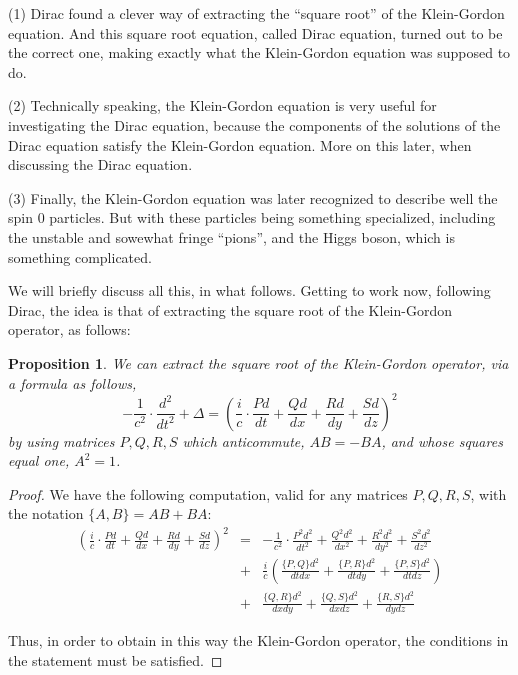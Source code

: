 \documentclass[12pt]{amsbook}
\newtheorem{proposition}[theorem]{Proposition}
\begin{document}
\bigskip

(1) Dirac found a clever way of extracting the ``square root'' of the Klein-Gordon equation. And this square root equation, called Dirac equation, turned out to be the correct one, making exactly what the Klein-Gordon equation was supposed to do.

\bigskip

(2) Technically speaking, the Klein-Gordon equation is very useful for investigating the Dirac equation, because the components of the solutions of the Dirac equation satisfy the Klein-Gordon equation. More on this later, when discussing the Dirac equation. 

\bigskip

(3) Finally, the Klein-Gordon equation was later recognized to describe well the spin 0 particles. But with these particles being something specialized, including the unstable and sowewhat fringe ``pions'', and the Higgs boson, which is something complicated. 

\bigskip

We will briefly discuss all this, in what follows. Getting to work now, following Dirac, the idea is that of extracting the square root of the Klein-Gordon operator, as follows:

\begin{proposition}
We can extract the square root of the Klein-Gordon operator, via a formula as follows,
$$-\frac{1}{c^2}\cdot\frac{d^2}{dt^2}+\Delta=\left(\frac{i}{c}\cdot\frac{Pd}{dt}+\frac{Qd}{dx}+\frac{Rd}{dy}+\frac{Sd}{dz}\right)^2$$
by using matrices $P,Q,R,S$ which anticommute, $AB=-BA$, and whose squares equal one, $A^2=1$.
\end{proposition}

\begin{proof}
We have the following computation, valid for any matrices $P,Q,R,S$, with the notation $\{A,B\}=AB+BA$:
\begin{eqnarray*}
\left(\frac{i}{c}\cdot\frac{Pd}{dt}+\frac{Qd}{dx}+\frac{Rd}{dy}+\frac{Sd}{dz}\right)^2
&=&-\frac{1}{c^2}\cdot\frac{P^2d^2}{dt^2}+\frac{Q^2d^2}{dx^2}+\frac{R^2d^2}{dy^2}+\frac{S^2d^2}{dz^2}\\
&+&\frac{i}{c}\left(\frac{\{P,Q\}d^2}{dtdx}+\frac{\{P,R\}d^2}{dtdy}+\frac{\{P,S\}d^2}{dtdz}\right)\\
&+&\frac{\{Q,R\}d^2}{dxdy}+\frac{\{Q,S\}d^2}{dxdz}+\frac{\{R,S\}d^2}{dydz}
\end{eqnarray*}

Thus, in order to obtain in this way the Klein-Gordon operator, the conditions in the statement must be satisfied.
\end{proof}
\end{document}
